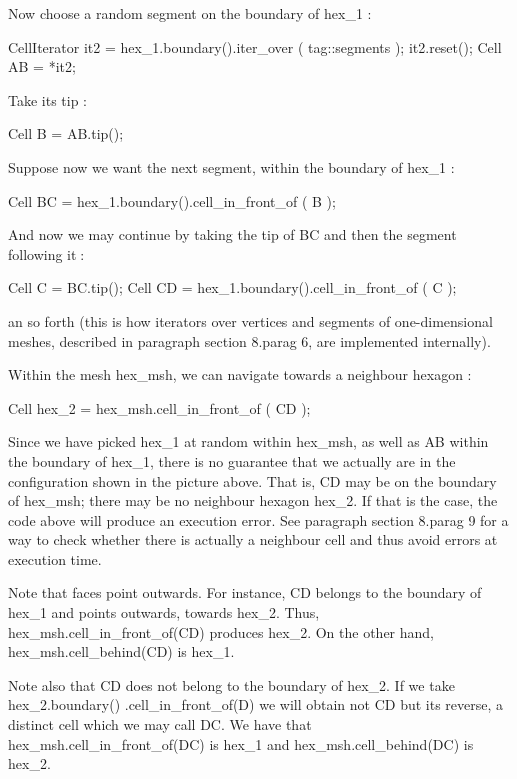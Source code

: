Now choose a random segment on the boundary of {\codett hex\_1} :

\verbatim
   CellIterator it2 = hex_1.boundary().iter_over ( tag::segments );
   it2.reset();
   Cell AB = *it2;
\endverbatim

Take its tip :

\verbatim
   Cell B = AB.tip();
\endverbatim

Suppose now we want the next segment, within the boundary of {\codett hex\_1} :

\verbatim
   Cell BC = hex_1.boundary().cell_in_front_of ( B );
\endverbatim

And now we may continue by taking the tip of {\codett BC} and then the segment
following it$\;$:

\verbatim
   Cell C = BC.tip();
   Cell CD = hex_1.boundary().cell_in_front_of ( C );
\endverbatim

\noindent an so forth (this is how iterators over vertices and segments of
one-dimensional meshes, described in paragraph \numb section 8.\numb parag 6,
are implemented internally).

Within the mesh {\codett hex\_msh}, we can navigate towards a neighbour hexagon :

\verbatim
   Cell hex_2 = hex_msh.cell_in_front_of ( CD );
\endverbatim

Since we have picked {\codett hex\_1} at random within {\codett hex\_msh},
as well as {\codett AB} within the boundary of {\codett hex\_1},
there is no guarantee that we actually are in the configuration shown in the
picture above.
That is, {\codett CD} may be on the boundary of {\codett hex\_msh};
there may be no neighbour hexagon {\codett hex\_2}.
If that is the case, the code above will produce an execution error.
See paragraph \numb section 8.\numb parag 9 for a way to check whether there is actually
a neighbour cell and thus avoid errors at execution time.

Note that faces point outwards.
For instance, {\codett CD} belongs to the boundary of {\codett hex\_1} and points
outwards, towards {\codett hex\_2}.
Thus, {\codett hex\_msh.cell\_in\_front\_of(CD)} produces {\codett hex\_2}.
On the other hand, {\codett hex\_msh.cell\_behind(CD)} is {\codett hex\_1}.

Note also that {\codett CD} does not belong to the boundary of {\codett hex\_2}.
If we take {\codett hex\_2.boundary() .cell\_in\_front\_of(D)} we will obtain not
{\codett CD} but its reverse, a distinct cell which we may call {\codett DC}.
We have that {\codett hex\_msh.cell\_in\_front\_of(DC)} is {\codett hex\_1} and
{\codett hex\_msh.cell\_behind(DC)} is {\codett hex\_2}.


